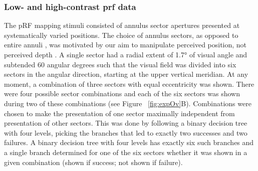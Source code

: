 \subsubsection{Low- and high-contrast prf data}
The pRF mapping stimuli consisted of annulus sector apertures presented at systematically varied positions. The choice of annulus sectors, as opposed to entire annuli \parencite{Liu2006}, was motivated by our aim to manipulate perceived position, not perceived depth \parencite{Edwards2003}. A single sector had a radial extent of 1.7° of visual angle and subtended 60 angular degrees such that the visual field was divided into six sectors in the angular direction, starting at the upper vertical meridian. At any moment, a combination of three sectors with equal eccentricity was shown. There were four possible sector combinations and each of the six sectors was shown during two of these combinations (see Figure ~\ref{fig:expOv}B). Combinations were chosen to make the presentation of one sector maximally independent from presentation of other sectors. This was done by following a binary decision tree with four levels, picking the branches that led to exactly two successes and two failures. A binary decision tree with four levels has exactly six such branches and a single branch determined for one of the six sectors whether it was shown in a given combination (shown if success; not shown if failure).

